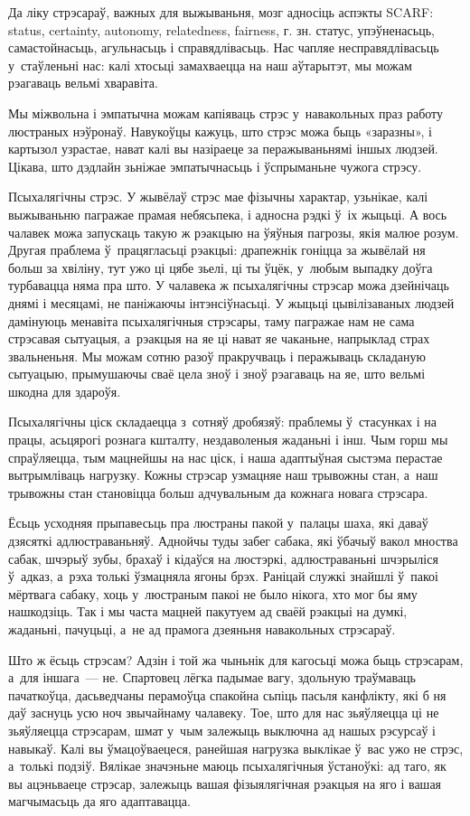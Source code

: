 Да ліку стрэсараў, важных для выжываньня, мозг адносіць аспэкты SCARF: status, certainty, autonomy, relatedness, fairness, г. зн. статус, упэўненасьць, самастойнасьць, агульнасьць і справядлівасьць. Нас чапляе несправядлівасьць у~стаўленьні нас: калі хтосьці замахваецца на наш аўтарытэт, мы можам рэагаваць вельмі хваравіта.

Мы міжвольна і эмпатычна можам капіяваць стрэс у~навакольных праз работу люстраных нэўронаў. Навукоўцы кажуць, што стрэс можа быць «заразны», і картызол узрастае, нават калі вы назіраеце за перажываньнямі іншых людзей. Цікава, што дэдлайн зьніжае эмпатычнасьць і ўспрыманьне чужога стрэсу.

Псыхалягічны стрэс. У жывёлаў стрэс мае фізычны характар, узьнікае, калі выжываньню пагражае прамая небясьпека, і адносна рэдкі ў~іх жыцьці. А вось чалавек можа запускаць такую ж рэакцыю на ўяўныя пагрозы, якія малюе розум. Другая праблема ў~працягласьці рэакцыі: драпежнік гоніцца за жывёлай ня больш за хвіліну, тут ужо ці цябе зьелі, ці ты ўцёк, у~любым выпадку доўга турбавацца няма пра што. У чалавека ж псыхалягічны стрэсар можа дзейнічаць днямі і месяцамі, не паніжаючы інтэнсіўнасьці. У жыцьці цывілізаваных людзей дамінуюць менавіта псыхалягічныя стрэсары, таму пагражае нам не сама стрэсавая сытуацыя, а~рэакцыя на яе ці нават яе чаканьне, напрыклад страх звальненьня. Мы можам сотню разоў пракручваць і перажываць складаную сытуацыю, прымушаючы сваё цела зноў і зноў рэагаваць на яе, што вельмі шкодна для здароўя. 

Псыхалягічны ціск складаецца з~сотняў дробязяў: праблемы ў~стасунках і на працы, асьцярогі рознага кшталту, нездаволеныя жаданьні і інш. Чым горш мы спраўляецца, тым мацнейшы на нас ціск, і наша адаптыўная сыстэма перастае вытрымліваць нагрузку. Кожны стрэсар узмацняе наш трывожны стан, а~наш трывожны стан становіцца больш адчувальным да кожнага новага стрэсара.

Ёсьць усходняя прыпавесьць пра люстраны пакой у~палацы шаха, які даваў дзясяткі адлюстраваньняў. Аднойчы туды забег сабака, які ўбачыў вакол мноства сабак, шчэрыў зубы, брахаў і кідаўся на люстэркі, адлюстраваньні шчэрыліся ў~адказ, а~рэха толькі ўзмацняла ягоны брэх. Раніцай служкі знайшлі ў~пакоі мёртвага сабаку, хоць у~люстраным пакоі не было нікога, хто мог бы яму нашкодзіць. Так і мы часта мацней пакутуем ад сваёй рэакцыі на думкі, жаданьні, пачуцьці, а~не ад прамога дзеяньня навакольных стрэсараў.

Што ж ёсьць стрэсам? Адзін і той жа чыньнік для кагосьці можа быць стрэсарам, а~для іншага~--- не. Спартовец лёгка падымае вагу, здольную траўмаваць пачаткоўца, дасьведчаны перамоўца спакойна сьпіць пасьля канфлікту, які б ня даў заснуць усю ноч звычайнаму чалавеку. Тое, што для нас зьяўляецца ці не зьяўляецца стрэсарам, шмат у~чым залежыць выключна ад нашых рэсурсаў і навыкаў. Калі вы ўмацоўваецеся, ранейшая нагрузка выклікае ў~вас ужо не стрэс, а~толькі подзіў. Вялікае значэньне маюць псыхалягічныя ўстаноўкі: ад таго, як вы ацэньваеце стрэсар, залежыць вашая фізыялягічная рэакцыя на яго і вашая магчымасьць да яго адаптавацца.

